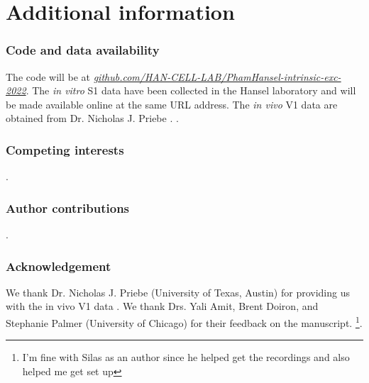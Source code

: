\section{Additional information}

\subsubsection*{Code and data availability}

The code will be at
    \href{https://github.com/HAN-CELL-LAB/PhamHansel-intrinsic-exc-2022}{\textit{github.com/HAN-CELL-LAB/PhamHansel-intrinsic-exc-2022}}.
The \textit{in vitro} S1 data have been collected in the Hansel laboratory \citep{Gill2020-wy}
    and will be made available online at the same URL address.
The \textit{in vivo} V1 data are obtained from Dr. Nicholas J. Priebe \citep{Li2020-ej}.
.

\subsubsection*{Competing interests}

.

\subsubsection*{Author contributions}

.

\subsubsection*{Acknowledgement}

We thank Dr. Nicholas J. Priebe (University of Texas, Austin)
    for providing us with the in vivo V1 data \citep{Li2020-ej}.
We thank Drs. Yali Amit, Brent Doiron, and Stephanie Palmer (University of Chicago)
    for their feedback on the manuscript.
\footnote{I'm fine with Silas as an author since he helped get the recordings and also helped me get set up}.
